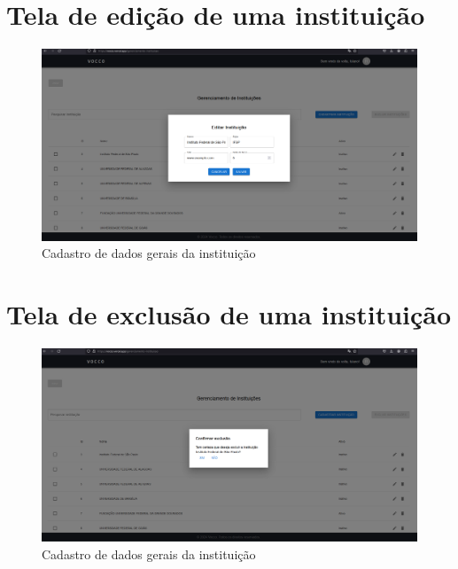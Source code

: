 \begin{apendicesenv}
\section{Tela de edição de uma instituição}
\begin{figure}[H]
    \centering
    \includegraphics[width=1.0\linewidth]{images/editar.png}
    \caption{Cadastro de dados gerais da instituição}
    \label{fig:editar}
\end{figure}

\section{Tela de exclusão de uma instituição}
\begin{figure}[H]
    \centering
    \includegraphics[width=1.0\linewidth]{images/exclusao.png}
    \caption{Cadastro de dados gerais da instituição}
    \label{fig:exclusao}
\end{figure}


\end{apendicesenv}
